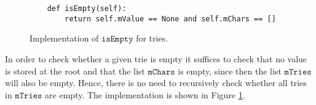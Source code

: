 \begin{figure}[!ht]
\centering
\begin{verbatim}
    def isEmpty(self):
        return self.mValue == None and self.mChars == []
\end{verbatim}
\vspace*{-0.3cm}
\caption{Implementation of $\texttt{isEmpty}$ for tries.}
\label{fig:trie.ipython-isEmpty}
\end{figure}

In order to check whether a given trie is empty it suffices to check that no value is stored at the root
and that the list $\texttt{mChars}$ is empty, since then the list $\texttt{mTries}$ will also be empty.  Hence,
there is no need to recursively check whether all tries in $\texttt{mTries}$ are empty.  
The implementation is shown in Figure \ref{fig:trie.ipython-isEmpty}.

